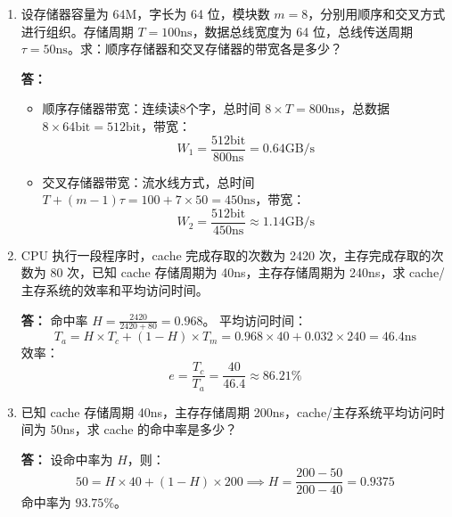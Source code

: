 \documentclass{article}
\begin{document}
\begin{enumerate}[label=\arabic*.]
    \textbf{答：}
    \begin{enumerate}[label=(\arabic*)]
        \item ROM 区域：$0000\text{H}\sim3\text{FFFH}$，大小16K，地址范围对应 $\text{A}_{15}\text{A}_{14}\text{A}_{13}\text{A}_{12}=0000\sim0011$，译码产生 ROM 片选。
        RAM 区域：$6000\text{H}\sim13\text{FFFH}$（40K×16位，需5片$8\text{K}\times16$位，由$8\text{K}\times8$位位扩展得到），地址线 $\text{A}_{15}\text{A}_{14}\text{A}_{13}\text{A}_{12}\text{A}_{11}$ 译码产生各 RAM 片选信号。
        \item （略，连接图：ROM 接数据总线低8位，RAM 由两片$8\text{K}\times8$位组成16位数据，地址线、控制线与 CPU 对应连接）
    \end{enumerate}

    \item 设存储器容量为 $64\text{M}$，字长为 64 位，模块数 $m=8$，分别用顺序和交叉方式进行组织。存储周期 $T=100\text{ns}$，数据总线宽度为 64 位，总线传送周期 $\tau=50\text{ns}$。求：顺序存储器和交叉存储器的带宽各是多少？
    
    \textbf{答：}
    \begin{itemize}
        \item 顺序存储器带宽：连续读8个字，总时间 $8\times T=800\text{ns}$，总数据 $8\times64\text{bit}=512\text{bit}$，带宽：
        \[
        W_1 = \frac{512\text{bit}}{800\text{ns}} = 0.64 \text{GB/s}
        \]
        \item 交叉存储器带宽：流水线方式，总时间 $T+(m-1)\tau=100+7\times50=450\text{ns}$，带宽：
        \[
        W_2 = \frac{512\text{bit}}{450\text{ns}} \approx 1.14 \text{GB/s}
        \]
    \end{itemize}

    \item CPU 执行一段程序时，cache 完成存取的次数为 2420 次，主存完成存取的次数为 80 次，已知 cache 存储周期为 40ns，主存存储周期为 240ns，求 cache/主存系统的效率和平均访问时间。
    
    \textbf{答：}
    命中率 $H=\frac{2420}{2420+80}=0.968$。
    平均访问时间：
    \[
    T_a = H\times T_c + (1-H)\times T_m = 0.968\times40 + 0.032\times240 = 46.4\text{ns}
    \]
    效率：
    \[
    e = \frac{T_c}{T_a} = \frac{40}{46.4} \approx 86.21\%
    \]

    \item 已知 cache 存储周期 40ns，主存存储周期 200ns，cache/主存系统平均访问时间为 50ns，求 cache 的命中率是多少？
    
    \textbf{答：}
    设命中率为 $H$，则：
    \[
    50 = H\times40 + (1-H)\times200 \implies H = \frac{200-50}{200-40} = 0.9375
    \]
    命中率为 $93.75\%$。


\end{enumerate}
\end{document}
